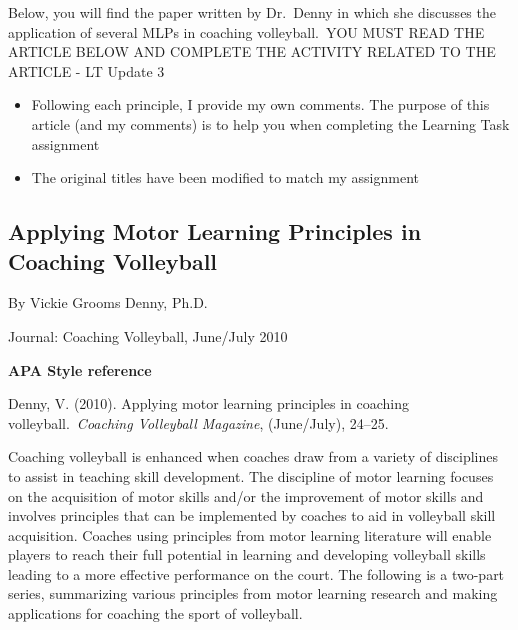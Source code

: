 \documentclass[
  letterpaper,
  DIV=11,
  numbers=noendperiod]{scrartcl}
\begin{document}
\begin{tcolorbox}[enhanced jigsaw, arc=.35mm, leftrule=.75mm, left=2mm, rightrule=.15mm, bottomrule=.15mm, toprule=.15mm, colback=white, opacityback=0, breakable]

Below, you will find the paper written by Dr.~Denny in which she
discusses the application of several MLPs in coaching volleyball.~YOU
MUST READ THE ARTICLE BELOW AND COMPLETE THE ACTIVITY RELATED TO THE
ARTICLE - LT Update 3

\begin{itemize}
\item
  Following each principle, I provide my own comments. The purpose of
  this article (and my comments) is to help you when completing the
  Learning Task assignment
\item
  The original titles have been modified to match my assignment
\end{itemize}

\end{tcolorbox}

\hypertarget{applying-motor-learning-principles-in-coaching-volleyball}{%
\subsection{\texorpdfstring{\textbf{Applying Motor Learning Principles
in Coaching
Volleyball}}{Applying Motor Learning Principles in Coaching Volleyball}}\label{applying-motor-learning-principles-in-coaching-volleyball}}

By Vickie Grooms Denny, Ph.D.

Journal: Coaching Volleyball, June/July 2010

\textbf{APA Style reference}

Denny, V. (2010). Applying motor learning principles in coaching
volleyball.~\emph{Coaching Volleyball Magazine}, (June/July), 24--25.

Coaching volleyball is enhanced when coaches draw from a variety of
disciplines to assist in teaching skill development. The discipline of
motor learning focuses on the acquisition of motor skills and/or the
improvement of motor skills and involves principles that can be
implemented by coaches to aid in volleyball skill acquisition. Coaches
using principles from motor learning literature will enable players to
reach their full potential in learning and developing volleyball skills
leading to a more effective performance on the court. The following is a
two-part series, summarizing various principles from motor learning
research and making applications for coaching the sport of volleyball.
\end{document}
